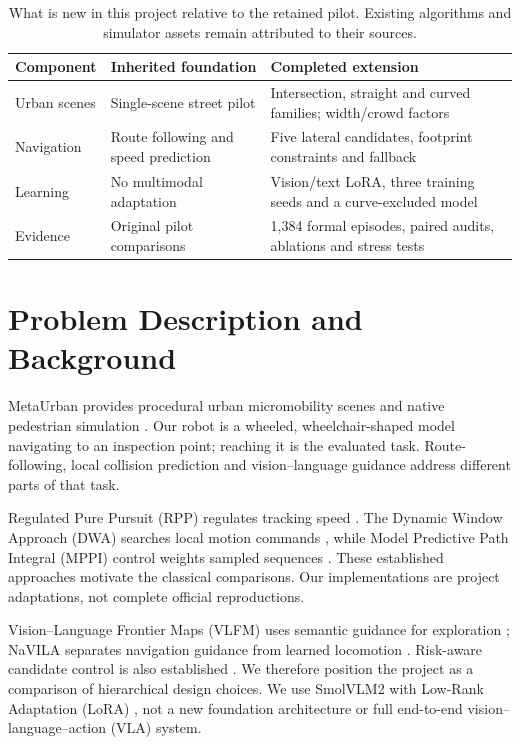 \documentclass[a4paper,12pt]{article}
\begin{document}
\begin{table}[ht]\centering\small\begin{spacing}{1.08}
\caption{What is new in this project relative to the retained pilot. Existing algorithms and simulator assets remain attributed to their sources.}\label{tab:new}
\begin{tabularx}{\linewidth}{p{.22\linewidth}YY}\toprule
Component & Inherited foundation & Completed extension\\\midrule
Urban scenes & Single-scene street pilot & Intersection, straight and curved families; width/crowd factors\\
Navigation & Route following and speed prediction & Five lateral candidates, footprint constraints and fallback\\
Learning & No multimodal adaptation & Vision/text LoRA, three training seeds and a curve-excluded model\\
Evidence & Original pilot comparisons & 1,384 formal episodes, paired audits, ablations and stress tests\\\bottomrule
\end{tabularx}\end{spacing}\end{table}

\section{Problem Description and Background}
MetaUrban provides procedural urban micromobility scenes and native pedestrian simulation \cite{metaurban}. Our robot is a wheeled, wheelchair-shaped model navigating to an inspection point; reaching it is the evaluated task. Route-following, local collision prediction and vision--language guidance address different parts of that task.

Regulated Pure Pursuit (RPP) regulates tracking speed \cite{rpp}. The Dynamic Window Approach (DWA) searches local motion commands \cite{dwa}, while Model Predictive Path Integral (MPPI) control weights sampled sequences \cite{mppi}. These established approaches motivate the classical comparisons. Our implementations are project adaptations, not complete official reproductions.

Vision--Language Frontier Maps (VLFM) uses semantic guidance for exploration \cite{vlfm}; NaVILA separates navigation guidance from learned locomotion \cite{navila}. Risk-aware candidate control is also established \cite{lrmcp}. We therefore position the project as a comparison of hierarchical design choices. We use SmolVLM2 \cite{smolvlm} with Low-Rank Adaptation (LoRA) \cite{lora}, not a new foundation architecture or full end-to-end vision--language--action (VLA) system.
\end{document}
